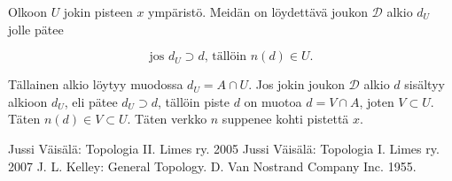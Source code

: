 \documentclass[12pt,a4paper,leqno]{report}
\newcommand{\D}{\mathcal{D}}
\theoremstyle{plain}
\theoremstyle{definition}
\theoremstyle{remark}
\begin{document}
Olkoon $U$ jokin pisteen $x$ ympäristö. Meidän on löydettävä joukon $\D$ alkio $d_U$ jolle pätee

\begin{equation}
\text{jos } d_U \supset d \text{, tällöin } n(d) \in U\text{.}
\end{equation}

Tällainen alkio löytyy muodossa $d_U = A \cap U$. Jos jokin joukon $\D$ alkio $d$ sisältyy alkioon $d_U$, eli pätee $d_U \supset d$, tällöin piste $d$ on muotoa $d = V \cap A$, joten $V \subset U$. Täten $n(d) \in V \subset U$. Täten verkko $n$ suppenee kohti pistettä $x$.

\begin{thebibliography}{9}

Jussi Väisälä: Topologia II. Limes ry. 2005
Jussi Väisälä: Topologia I. Limes ry. 2007
J. L. Kelley: General Topology. D. Van Nostrand Company Inc. 1955.
\end{thebibliography}
\end{document}
